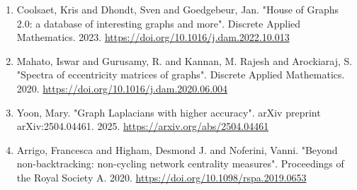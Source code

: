 \documentclass[
]{article}
\begin{document}
\begin{enumerate}
  \url{https://oeis.org/A006608}
\item
  \protect{}\label{ref-coolsaet2023}{}Coolsaet, Kris and D\textquotesingle hondt, Sven and Goedgebeur, Jan. "House of Graphs 2.0: a database of interesting graphs and more". Discrete Applied Mathematics. 2023.
  \url{https://doi.org/10.1016/j.dam.2022.10.013}
\item
  \protect{}\label{ref-mahato2020}{}Mahato, Iswar and Gurusamy, R. and Kannan, M. Rajesh and Arockiaraj, S. "Spectra of eccentricity matrices of graphs". Discrete Applied Mathematics. 2020.
  \url{https://doi.org/10.1016/j.dam.2020.06.004}
\item
  \protect{}\label{ref-yoon2025}{}Yoon, Mary. "Graph Laplacians with higher accuracy". arXiv preprint arXiv:2504.04461. 2025.
  \url{https://arxiv.org/abs/2504.04461}
\item
  \protect{}\label{ref-arrigo2020}{}Arrigo, Francesca and Higham, Desmond J. and Noferini, Vanni. "Beyond non-backtracking: non-cycling network centrality measures". Proceedings of the Royal Society A. 2020.
  \url{https://doi.org/10.1098/rspa.2019.0653}
\end{enumerate}
\end{document}
